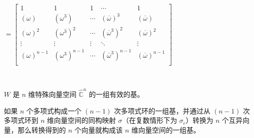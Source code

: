 \text{ } \text{ }  $= \begin{bmatrix}
1 & 1 & 1 & \cdots & 1\\
(\omega) & (\omega^3) & \cdots & (\overline{\omega})^3 & (\overline{\omega})\\
(\omega)^2 & (\omega^3)^2 & \cdots & (\overline{\omega}^3)^2 & (\overline{\omega})^2\\
\vdots & \vdots & \vdots & \ddots & \vdots \\
(\omega)^{n-1} & (\omega^3)^{n-1} & \cdots & (\overline{\omega}^3)^{n-1} & (\overline{\omega})^{n-1}\\
\end{bmatrix}$

$ $

$W$ 是 $n$ 维特殊向量空间 $\hat{\mathbb C}^{n}$ 的一组有效的基。



\begin{tcolorbox}[title={\textbf{\tboxtheorem{\ref*{subsec:poly-vector-transformation-complex}} 多项式环与向量空间之间的基变换}}]

如果 $n$ 个多项式构成一个 $(n-1)$ 次多项式环的一组基，并通过从 $(n-1)$ 次多项式环到 $n$ 维向量空间的同构映射 $\sigma$（在复数情形下为 $\sigma_c$）转换为 $n$ 个互异向量，那么转换得到的 $n$ 个向量就构成该 $n$ 维向量空间的一组基。

\end{tcolorbox}
